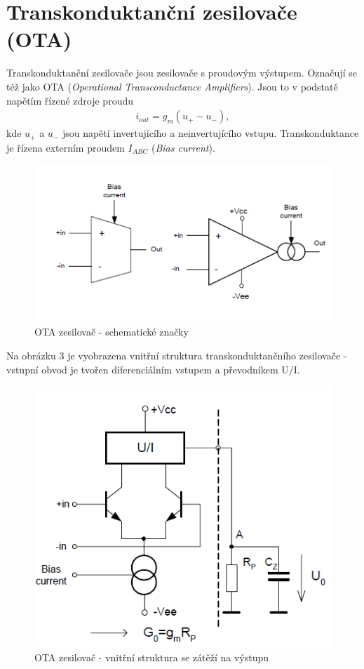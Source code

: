 \documentclass[twoside]{article}
\begin{document}
\section{Transkonduktanční zesilovače (OTA)}
Transkonduktanční zesilovače jsou zesilovače s proudovým výstupem. Označují se též jako OTA (\textit{Operational Transconductance Amplifiers}). Jsou to v podstatě napětím řízené zdroje proudu
\begin{align}
i_{out} = g_m(u_+ - u_-),
\end{align}
kde $u_+$ a $u_-$ jsou napětí invertujícího a neinvertujícího vstupu.  Transkonduktance je řízena externím proudem $I_{ABC}$ (\textit{Bias current}).
\begin{figure}[H]
\centering
\includegraphics[scale=0.75]{image7.png}
\caption{OTA zesilovač - schematické značky \cite{2}}
\end{figure}
\noindent Na obrázku 3 je vyobrazena vnitřní struktura transkonduktančního zesilovače  - vstupní obvod je tvořen diferenciálním vstupem a převodníkem U/I.
\begin{figure}[H]
\centering
\includegraphics[scale=0.5]{image8.png}
\caption{OTA zesilovač - vnitřní struktura se zátěží na výstupu \cite{2}}
\end{figure}
\end{document}
